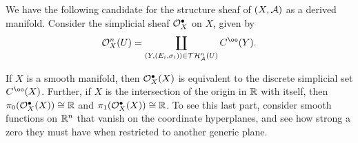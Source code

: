 We have the following candidate for the structure sheaf of $(X, \mathcal A)$ as a derived manifold. Consider the simplicial sheaf $\mathcal O_X^\bullet$ on $X$, given by
\[ \cO_X^n(U) = \coprod_{(Y, (E_i, \sigma_i)) \in \cT \cH_\cA^n(U)} C^\oo(Y). \]


\begin{speculation}
If $X$ is a smooth manifold, then $\mathcal O_X^\bullet(X)$ is equivalent to the discrete simplicial set $C^\oo(X)$. Further, if $X$ is the intersection of the origin in $\mathbb R$ with itself, then $\pi_0(\mathcal O_X^\bullet(X)) \cong \mathbb R$ and $\pi_1(\mathcal O_X^\bullet(X)) \cong \mathbb R$. To see this last part, consider smooth functions on $\mathbb R^n$ that vanish on the coordinate hyperplanes, and see how strong a zero they must have when restricted to another generic plane.
\end{speculation}